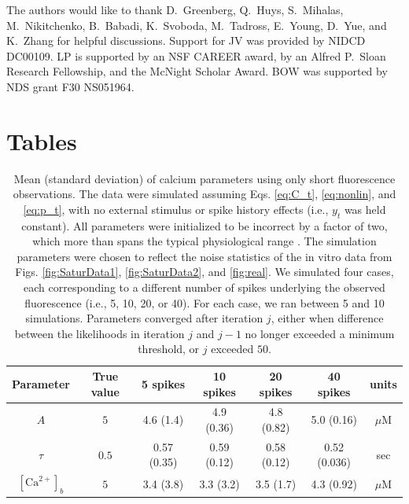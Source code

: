 \documentclass[12pt]{article}
\newcommand{\Ca}{[\text{Ca}^{2+}]}
\begin{document}
\begin{table}[b]
\small{The authors would like to thank D.\ Greenberg, Q.\ Huys, S.\ Mihalas, M.\ Nikitchenko, B.\ Babadi, K.\ Svoboda, M.\ Tadross, E.\ Young, D.\ Yue, and K.\ Zhang for helpful discussions.  Support for JV was provided by NIDCD DC00109.  LP is supported by an NSF CAREER award, by an Alfred P.\ Sloan Research Fellowship, and the McNight Scholar Award. BOW was supported by NDS grant F30 NS051964.}
\end{table}

\clearpage \newpage

%


\newpage


\section*{Tables}

\begin{table}[h]
\caption{Mean (standard deviation) of calcium parameters using only short fluorescence observations. The data were simulated assuming Eqs. \ref{eq:C_t}, \ref{eq:nonlin}, and \ref{eq:p_t}, with no external stimulus or spike history effects (i.e., $y_t$ was held constant). All parameters were initialized to be incorrect by a factor of two, which more than spans the typical physiological range \cite{YaksiFriedrich06}. The simulation parameters were chosen to reflect the noise statistics of the in vitro data from Figs. \ref{fig:SaturData1}, \ref{fig:SaturData2}, and \ref{fig:real}. We simulated four cases, each corresponding to a different number of spikes underlying the observed fluorescence (i.e., 5, 10, 20, or 40).  For each case, we ran between 5 and 10 simulations.  Parameters converged after iteration $j$, either when difference between the likelihoods in iteration $j$ and $j-1$ no longer exceeded a minimum threshold, or $j$ exceeded $50$.} \label{tab:params}
\begin{tabular}{c|c|c|c|c|c|c}
Parameter & True value & 5 spikes & 10 spikes & 20 spikes & 40 spikes & units \\ \hline
$A$ & $5$ & 4.6 (1.4) & 4.9 (0.36) & 4.8 (0.82) & 5.0 (0.16) & $\mu$M \\
$\tau$ & $0.5$ & 0.57 (0.35) & 0.59 (0.12) & 0.58 (0.12) & 0.52 (0.036) & sec \\
$\Ca_b$ & $5$ & 3.4 (3.8) & 3.3 (3.2) & 3.5 (1.7) & 4.3 (0.92) & $\mu$M
\end{tabular}
\end{table}
\end{document}
